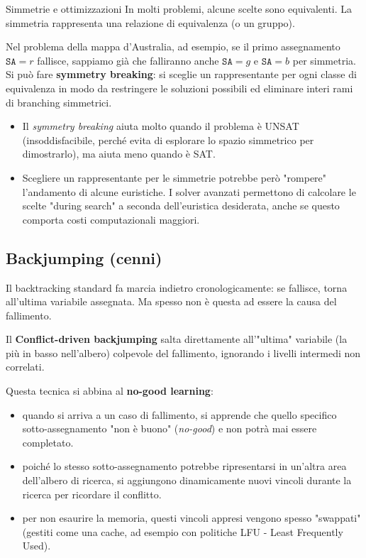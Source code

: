 \documentclass[a4paper,11pt]{report}
\begin{document}
\begin{gframe}{Simmetrie e ottimizzazioni}{}
    In molti problemi, alcune scelte sono equivalenti. La simmetria rappresenta una relazione di equivalenza (o un gruppo). 
    
    Nel problema della mappa d'Australia, ad esempio, se il primo assegnamento $\texttt{SA}=r$ fallisce, sappiamo già che falliranno anche $\texttt{SA}=g$ e $\texttt{SA}=b$ per simmetria. Si può fare \textbf{symmetry breaking}: si sceglie un rappresentante per ogni classe di equivalenza in modo da restringere le soluzioni possibili ed eliminare interi rami di branching simmetrici. 
    \begin{itemize}
        \item Il \textit{symmetry breaking} aiuta molto quando il problema è UNSAT (insoddisfacibile, perché evita di esplorare lo spazio simmetrico per dimostrarlo), ma aiuta meno quando è SAT.
        \item Scegliere un rappresentante per le simmetrie potrebbe però "rompere" l'andamento di alcune euristiche. I solver avanzati permettono di calcolare le scelte "during search" a seconda dell'euristica desiderata, anche se questo comporta costi computazionali maggiori.
    \end{itemize}
\end{gframe}

\subsection{Backjumping (cenni)}
Il backtracking standard fa marcia indietro cronologicamente: se fallisce, torna all'ultima variabile assegnata. Ma spesso non è questa ad essere la causa del fallimento.

Il \textbf{Conflict-driven backjumping} salta direttamente all'"ultima" variabile (la più in basso nell'albero) colpevole del fallimento, ignorando i livelli intermedi non correlati.

Questa tecnica si abbina al \textbf{no-good learning}:
\begin{itemize}
    \item quando si arriva a un caso di fallimento, si apprende che quello specifico sotto-assegnamento "non è buono" (\textit{no-good}) e non potrà mai essere completato.
    \item poiché lo stesso sotto-assegnamento potrebbe ripresentarsi in un'altra area dell'albero di ricerca, si aggiungono dinamicamente nuovi vincoli durante la ricerca per ricordare il conflitto.
    \item per non esaurire la memoria, questi vincoli appresi vengono spesso "swappati" (gestiti come una cache, ad esempio con politiche LFU - Least Frequently Used).
\end{itemize}
\end{document}
